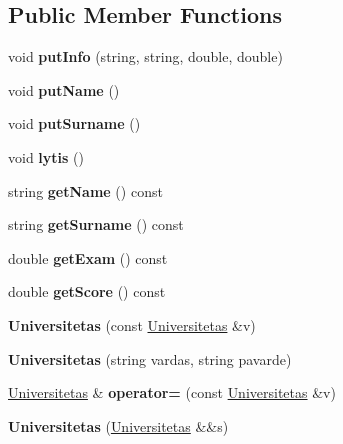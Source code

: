 \subsection*{Public Member Functions}
\begin{DoxyCompactItemize}
\item 
\mbox{\label{class_universitetas_a2b34b81645c6b2a191d7d610bf7d7683}} 
void {\bfseries put\+Info} (string, string, double, double)
\item 
\mbox{\label{class_universitetas_a9f5753aa27cf6cfabe0c809d41548e6a}} 
void {\bfseries put\+Name} ()
\item 
\mbox{\label{class_universitetas_a97b9db8f0b922a223d97b96210a0995b}} 
void {\bfseries put\+Surname} ()
\item 
\mbox{\label{class_universitetas_a5665b66fb2384226168412862228cc8b}} 
void {\bfseries lytis} ()
\item 
\mbox{\label{class_universitetas_ae0ea7ef86a8d88001284183ff9e44b78}} 
string {\bfseries get\+Name} () const
\item 
\mbox{\label{class_universitetas_a3b163e3e91ebe5608cea2d34a6897d0f}} 
string {\bfseries get\+Surname} () const
\item 
\mbox{\label{class_universitetas_a31b1ed81a12b27f72d613ea0f48531a7}} 
double {\bfseries get\+Exam} () const
\item 
\mbox{\label{class_universitetas_aa8dfbd314945b4aa3ccf95ee1df81440}} 
double {\bfseries get\+Score} () const
\item 
\mbox{\label{class_universitetas_a548268d8ba4a757ac35b6070307e6f63}} 
{\bfseries Universitetas} (const \mbox{\hyperlink{class_universitetas}{Universitetas}} \&v)
\item 
\mbox{\label{class_universitetas_a274794db6c14538a601b01f5997ba96e}} 
{\bfseries Universitetas} (string vardas, string pavarde)
\item 
\mbox{\label{class_universitetas_afb509db6593311f1183f6c1f0fabf7e7}} 
\mbox{\hyperlink{class_universitetas}{Universitetas}} \& {\bfseries operator=} (const \mbox{\hyperlink{class_universitetas}{Universitetas}} \&v)
\item 
\mbox{\label{class_universitetas_a0480354b12f0ae04b71f676d4f1425ec}} 
{\bfseries Universitetas} (\mbox{\hyperlink{class_universitetas}{Universitetas}} \&\&s)
\end{DoxyCompactItemize}
